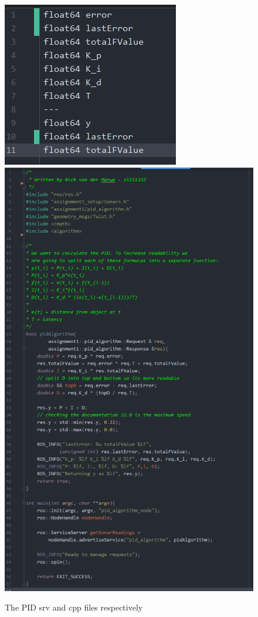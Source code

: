 \documentclass{article}
\begin{document}
\begin{figure}[ht]
    \centering
    \includegraphics[scale=0.43]{img/pidSrv.png} \\
    \includegraphics[scale=0.43]{img/pidAlgorithm.png}
    \caption{The PID srv and cpp files respectively}
    \label{pidCode}
\end{figure}
\newpage
\end{document}
